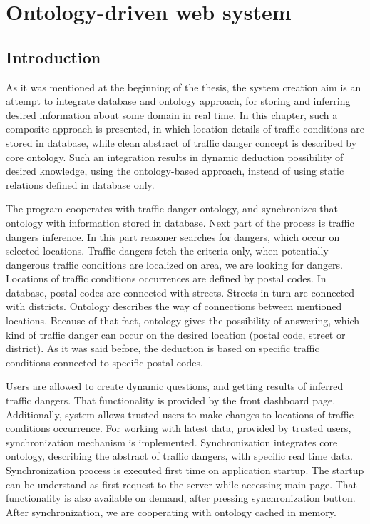 \chapter{Ontology-driven web system}
\label{cha:trafficDangerWebSystem}

\section{Introduction}
\label{sec:introductionTochapter4}

As it was mentioned at the beginning of the thesis, the system creation aim is an attempt to integrate database and ontology approach, for storing and inferring desired information about some domain in real time. In this chapter, such a composite approach is presented, in which location details of traffic conditions are stored in database, while clean abstract of traffic danger concept is described by core ontology. Such an integration results in dynamic deduction possibility of desired knowledge, using the ontology-based approach, instead of using static relations defined in database only.

The program cooperates with traffic danger ontology, and synchronizes that ontology with information stored in database. Next part of the process is traffic dangers inference. In this part reasoner searches for dangers, which occur on selected locations. Traffic dangers fetch the criteria only, when potentially dangerous traffic conditions are localized on area, we are looking for dangers. Locations of traffic conditions occurrences are defined by postal codes. In database, postal codes are connected with streets. Streets in turn are connected with districts. Ontology describes the way of connections between mentioned locations. Because of that fact, ontology gives the possibility of answering, which kind of traffic danger can occur on the desired location (postal code, street or district). As it was said before, the deduction is based on specific traffic conditions connected to specific postal codes.

Users are allowed to create dynamic questions, and getting results of inferred traffic dangers. That functionality is provided by the front dashboard page. Additionally, system allows trusted users to make changes to locations of traffic conditions occurrence. For working with latest data, provided by trusted users, synchronization mechanism is implemented. Synchronization integrates core ontology, describing the abstract of traffic dangers, with specific real time data. Synchronization process is executed first time on application startup. The startup can be understand as first request to the server while accessing main page. That functionality is also available on demand, after pressing synchronization button. After synchronization, we are cooperating with ontology cached in memory.

